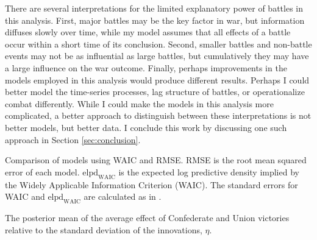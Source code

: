 There are several interpretations for the limited explanatory power of battles in this analysis.
First, major battles may be the key factor in war, but information diffuses slowly over time, while my model assumes that all effects of a battle occur within a short time of its conclusion.
Second, smaller battles and non-battle events may not be as influential as large battles, but cumulatively they may have a large influence on the war outcome.
Finally, perhaps improvements in the models employed in this analysis would produce different results.
Perhaps I could better model the time-series processes, lag structure of battles, or operationalize combat differently.
While I could make the models in this analysis more complicated, a better approach to distinguish between these interpretations is not better models, but better data.
I conclude this work by discussing one such approach in Section \ref{sec:conclusion}.

\begin{table}[!htpb]
  \centering
  
  \caption[Comparison of models using WAIC and RMSE]{
    Comparison of models using WAIC and RMSE.
    RMSE is the root mean squared error of each model.
    $\text{elpd}_{\text{WAIC}}$ is the expected log predictive density implied by the Widely Applicable Information Criterion (WAIC).
    The standard errors for WAIC and $\text{elpd}_{\text{WAIC}}$ are calculated as in \textcite{GelmanVehtari2014a}.
  }
  \label{bonds:tab:waic}
\end{table}

\begin{table}[!htpb]
  \centering
  
  \caption{The posterior mean of the average effect of Confederate and Union victories relative to the standard deviation of the innovations, $\eta$.}
  \label{bonds:tab:blt_effects_size}
\end{table}





